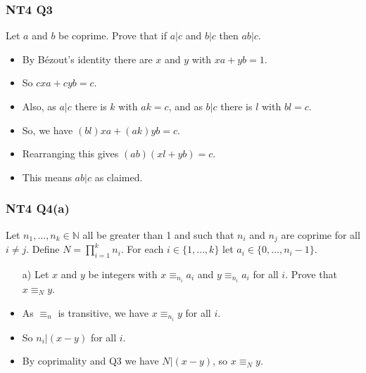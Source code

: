 \documentclass[handout]{beamer}
\newcommand{\bN}{\mathbb{N}}
\begin{document}
\begin{frame}
\frametitle{NT4 Q3}
Let $a$ and $b$ be coprime. Prove that if $a| c$ and $b|c$ then $ab|c$.
\vspace{0.5cm}
\begin{itemize}
\item By B\'ezout's identity there are $x$ and $y$ with $xa + yb = 1$. 
\vspace{0.3cm}
\item So $cxa + cyb = c$. 
\vspace{0.3cm}
\item Also, as $a| c$ there is $k$ with $ak = c$, and as $b|c$ there is $l$ with $bl = c$. 
\vspace{0.3cm}
\item So, we have $(bl)xa + (ak)yb = c$.
\vspace{0.3cm}
\item Rearranging this gives $(ab)(xl + yb) = c$.
\vspace{0.3cm}
\item This means $ab|c$ as claimed.
\end{itemize}
\end{frame}

\begin{frame}
\frametitle{NT4 Q4(a)}
Let $n_1,\ldots,n_k\in\bN$ all be greater than 1 and such that $n_i$ and $n_j$ are coprime for all $i\neq j$. Define $N=\prod_{i=1}^k n_i$. For each $i\in\{1,\ldots,k\}$ let $a_i\in\{0,\ldots, n_i-1\}$. 
\vspace{1cm}
\begin{enumerate}
\item[a)] Let $x$ and $y$ be integers with $x \equiv_{n_i} a_i$ and $y \equiv_{n_i} a_i$ for all $i$. Prove that $x\equiv_N y$.
\end{enumerate}
\begin{itemize}
\item As $\equiv_n$ is transitive, we have $x\equiv_{n_i} y$ for all $i$.
\item So $n_i|(x-y)$ for all $i$.
\item By coprimality and Q3 we have $N|(x-y)$, so $x \equiv_N y$.
\end{itemize}
\end{frame}
\end{document}
